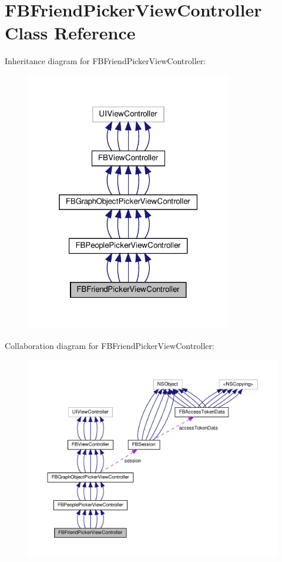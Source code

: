 \hypertarget{interfaceFBFriendPickerViewController}{}\section{F\+B\+Friend\+Picker\+View\+Controller Class Reference}
\label{interfaceFBFriendPickerViewController}


Inheritance diagram for F\+B\+Friend\+Picker\+View\+Controller\+:
\nopagebreak
\begin{figure}[H]
\begin{center}
\leavevmode
\includegraphics[width=256pt]{interfaceFBFriendPickerViewController__inherit__graph}
\end{center}
\end{figure}


Collaboration diagram for F\+B\+Friend\+Picker\+View\+Controller\+:
\nopagebreak
\begin{figure}[H]
\begin{center}
\leavevmode
\includegraphics[width=350pt]{interfaceFBFriendPickerViewController__coll__graph}
\end{center}
\end{figure}
